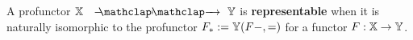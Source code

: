 
%
%
%
%
%
%
%
%
%
%
%
%
%


A profunctor $\X\proarrow \Y$ is {\bf representable} when it is naturally isomorphic to the profunctor $F_*:=\mathbb{Y}(F-,=)$ for a functor $F: \mathbb{X}\to \mathbb{Y}$.


